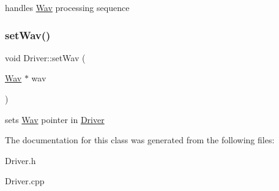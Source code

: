 handles \hyperlink{classWav}{Wav} processing sequence \mbox{\label{classDriver_a5d58141395b60701ae65d3623c3053f6}} 
\subsubsection{\texorpdfstring{set\+Wav()}{setWav()}}
{\footnotesize\ttfamily void Driver\+::set\+Wav (\begin{DoxyParamCaption}\item[{\hyperlink{classWav}{Wav} $\ast$}]{wav }\end{DoxyParamCaption})}


\begin{DoxyItemize}
\item sets \hyperlink{classWav}{Wav} pointer in \hyperlink{classDriver}{Driver} 
\end{DoxyItemize}

The documentation for this class was generated from the following files\+:\begin{DoxyCompactItemize}
\item 
Driver.\+h\item 
Driver.\+cpp\end{DoxyCompactItemize}
